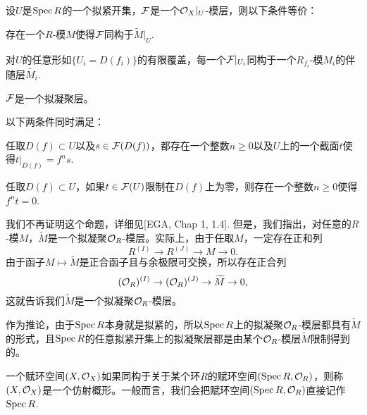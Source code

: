 \begin{pro}[素谱上的拟凝聚层]\label{niningju}
设$U$是$\operatorname{Spec} R$的一个拟紧开集，$\mathcal{F}$是一个$\mathcal{O}_X|_U$-模层，则以下条件等价：
\begin{compactenum}[~~~(1).]
\item 存在一个$R$-模$M$使得$\mathcal{F}$同构于$\widetilde{M}|_U$.
\item 对$U$的任意形如$\{U_i=D(f_i)\}$的有限覆盖，每一个$\mathcal{F}|_{U_i}$同构于一个$R_{f_i}$-模$M_i$的伴随层$\widetilde{M_i}$.
\item $\mathcal{F}$是一个拟凝聚层。
\item 以下两条件同时满足：
\begin{compactenum}[\hspace{-1em}1.]
\item 任取$D(f)\subset U$以及$s\in \mathcal{F}(D(f))$，都存在一个整数$n\geq 0$以及$U$上的一个截面$t$使得$t|_{D(f)}=f^ns$.
\item 任取$D(f)\subset U$，如果$t\in \mathcal{F}(U)$限制在$D(f)$上为零，则存在一个整数$n\geq 0$使得$f^nt=0$.
\end{compactenum}
\end{compactenum}
\end{pro}

我们不再证明这个命题，详细见[EGA, Chap 1, 1.4]. 但是，我们指出，对任意的$R$-模$M$，$\widetilde{M}$是一个拟凝聚$\mathcal{O}_R$-模层。实际上，由于任取$M$，一定存在正和列
\[
	R^{(I)}\to R^{(J)}\to M\to 0.
\]
由于函子$M\mapsto \widetilde{M}$是正合函子且与余极限可交换，所以存在正合列
\[
	(\mathcal{O}_R)^{(I)}\to (\mathcal{O}_R)^{(J)}\to \widetilde{M}\to 0,
\]
这就告诉我们$\widetilde{M}$是一个拟凝聚$\mathcal{O}_R$-模层。

作为推论，由于$\operatorname{Spec} R$本身就是拟紧的，所以$\operatorname{Spec} R$上的拟凝聚$\mathcal{O}_R$-模层都具有$\widetilde{M}$的形式，且$\operatorname{Spec} R$的任意拟紧开集上的拟凝聚层都是由某个$\mathcal{O}_R$-模层$\widetilde{M}$限制得到的。

\begin{para}[仿射概形]
一个赋环空间$(X,\mathcal{O}_X)$如果同构于关于某个环$R$的赋环空间$(\operatorname{Spec} R,\mathcal{O}_R)$，则称$(X,\mathcal{O}_X)$是一个仿射概形。一般而言，我们会把赋环空间$(\operatorname{Spec} R,\mathcal{O}_R)$直接记作$\operatorname{Spec} R$.

\end{para}

